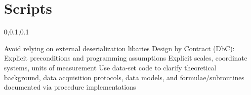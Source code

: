 
\section{Scripts}\fbeg{}\begin{frame}{}


\vspace{-.5em}	

{\Large{}\selectfont

\hspace*{20pt}\begin{minipage}{.96\textwidth}
\vspace{4pt}
		
\begin{lightquadblockc}{0,0.1,0.1}{\parbox{21cm}{\centering \vspace{3pt}}}
\begin{center}\begin{minipage}{\textwidth}
{\Huge \setlength{\leftmargini}{30pt}\begin{enumerate}
\dmitem {\dsp} Avoid relying on external deserialization libaries 
\vspace{20pt}
\dmitem {\dsp} Design by Contract (DbC): Explicit preconditions and programming assumptions
\vspace{20pt}
\dmitem {\dsp} Explicit scales, coordinate systems, units of measurement 
\vspace{20pt}
\dmitem {\dsp} Use data-set code to clarify theoretical background, data acquisition protocols, 
data models, and formulae/subroutines documented via procedure implementations
\vspace{20pt}
\end{enumerate}
}\end{minipage}
\end{center}
\end{lightquadblockc}
\end{minipage}

}

\end{frame}

